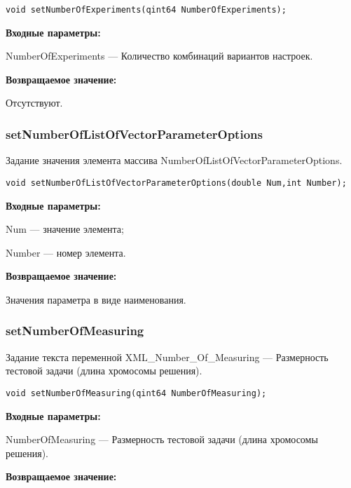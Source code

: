 \documentclass[a4paper,12pt]{article}
\begin{document}
\begin{lstlisting}[label=code_syntax_setNumberOfExperiments,caption=Синтаксис]
void setNumberOfExperiments(qint64 NumberOfExperiments);
\end{lstlisting}

\textbf{Входные параметры:}

NumberOfExperiments --- Количество комбинаций вариантов настроек.

\textbf{Возвращаемое значение:}

Отсутствуют.


\subsubsection{setNumberOfListOfVectorParameterOptions}\label{setNumberOfListOfVectorParameterOptions}

Задание значения элемента массива NumberOfListOfVectorParameterOptions.


\begin{lstlisting}[label=code_syntax_setNumberOfListOfVectorParameterOptions,caption=Синтаксис]
void setNumberOfListOfVectorParameterOptions(double Num,int Number);
\end{lstlisting}

\textbf{Входные параметры:}

Num --- значение элемента;
 
    Number --- номер элемента.

\textbf{Возвращаемое значение:}

Значения параметра в виде наименования.


\subsubsection{setNumberOfMeasuring}\label{setNumberOfMeasuring}

Задание текста переменной  XML\_Number\_Of\_Measuring --- Размерность тестовой задачи (длина хромосомы решения).


\begin{lstlisting}[label=code_syntax_setNumberOfMeasuring,caption=Синтаксис]
void setNumberOfMeasuring(qint64 NumberOfMeasuring);
\end{lstlisting}

\textbf{Входные параметры:}

NumberOfMeasuring --- Размерность тестовой задачи (длина хромосомы решения).

\textbf{Возвращаемое значение:}
\end{document}
